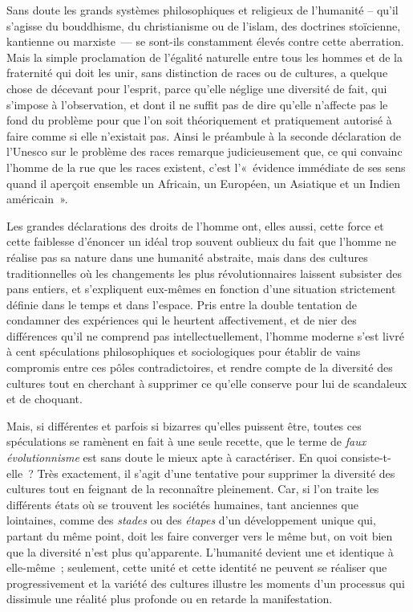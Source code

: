 \documentclass[french,twoside]{book} %
\begin{document}
Sans doute les grands systèmes philosophiques et religieux de l’humanité – qu’il s’agisse du bouddhisme, du christianisme ou de l’islam, des doctrines stoïcienne, kantienne ou marxiste — se sont-ils constamment élevés contre cette aberration. Mais la simple proclamation de l’égalité naturelle entre tous les hommes et de la fraternité qui doit les unir, sans distinction de races ou de cultures, a quelque chose de décevant pour l’esprit, parce qu’elle néglige une diversité de fait, qui s’impose à l’observation, et dont il ne suffit pas de dire qu’elle n’affecte pas le fond du problème pour que l’on soit théoriquement et pratiquement autorisé à faire comme si elle n’existait pas. Ainsi le préambule à la seconde déclaration de l’Unesco sur le problème des races remarque judicieusement que, ce qui convainc l’homme de la rue que les races existent, c’est l’« évidence immédiate de ses sens quand il aperçoit ensemble un Africain, un Européen, un Asiatique et un Indien américain ».\par
Les grandes déclarations des droits de l’homme ont, elles aussi, cette force et cette faiblesse d’énoncer un idéal trop souvent oublieux du fait que l’homme ne réalise pas sa nature dans une humanité abstraite, mais dans des cultures traditionnelles où les changements les plus révolutionnaires laissent subsister des pans entiers, et s’expliquent eux-mêmes en fonction d’une situation strictement définie dans le temps et dans l’espace. Pris entre la double tentation de condamner des expériences qui le heurtent affectivement, et de nier des différences qu’il ne comprend pas intellectuellement, l’homme moderne s’est livré à cent spéculations philosophiques et sociologiques pour établir de vains compromis entre ces pôles contradictoires, et rendre compte de la diversité des cultures tout en cherchant à supprimer ce qu’elle conserve pour lui de scandaleux et de choquant.\par
Mais, si différentes et parfois si bizarres qu’elles puissent être, toutes ces spéculations se ramènent en fait à une seule recette, que le terme de \emph{faux évolutionnisme} est sans doute le mieux apte à caractériser. En quoi consiste-t-elle ? Très exactement, il s’agit d’une tentative pour supprimer la diversité des cultures tout en feignant de la reconnaître pleinement. Car, si l’on traite les différents états où se trouvent les sociétés humaines, tant anciennes que lointaines, comme des \emph{stades} ou des \emph{étapes} d’un développement unique qui, partant du même point, doit les faire converger vers le même but, on voit bien que la diversité n’est plus qu’apparente. L’humanité devient une et identique à elle-même ; seulement, cette unité et cette identité ne peuvent se réaliser que progressivement et la variété des cultures illustre les moments d’un processus qui dissimule une réalité plus profonde ou en retarde la manifestation.\par
\end{document}
